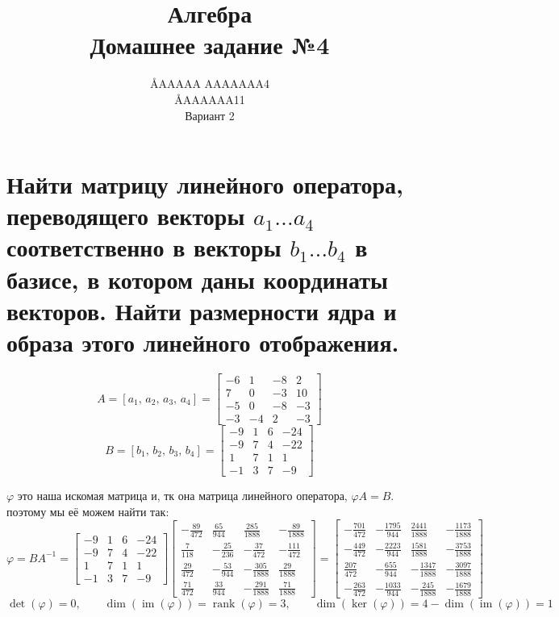 \documentclass{article}
\title{Алгебра \\ Домашнее задание №4}
\author{\AA{AAAAA AAAAAAA}{4} \\ \AA{AAAAAA}{11} \\ Вариант 2}
\renewcommand{\f}{\frac}
\renewcommand{\l}{\left}
\renewcommand{\r}{\right}
\renewcommand{\phi}{\varphi}
\DeclareMathOperator{\rank}{rank}
\DeclareMathOperator{\im}{im}
\begin{document}
  \maketitle

  \section{Найти матрицу линейного оператора, переводящего векторы $a_1 \dots a_4$ соответственно в векторы $b_1 \dots b_4$ в базисе, в котором даны координаты векторов. Найти размерности ядра и образа этого линейного отображения.}
  $$A = \l[a_1,\, a_2,\, a_3,\, a_4\r] = \begin{bmatrix}-6&1&-8&2\\7&0&-3&10\\-5&0&-8&-3\\-3&-4&2&-3\end{bmatrix}$$
  $$B = \l[b_1,\, b_2,\, b_3,\, b_4\r] = \begin{bmatrix}-9&1&6&-24\\-9&7&4&-22\\1&7&1&1\\-1&3&7&-9\end{bmatrix}$$

  \noindent
  $\phi$ это наша искомая матрица и, тк она матрица линейного оператора, $\phi A = B$.
  поэтому мы её можем найти так:
  $$\phi = BA^{-1} = \begin{bmatrix}-9&1&6&-24\\-9&7&4&-22\\1&7&1&1\\-1&3&7&-9\end{bmatrix} \begin{bmatrix}- \f{89}{472} & \f{65}{944} & \frac{285}{1888} & - \f{89}{1888}\\\f{7}{118} & - \f{25}{236} & - \f{37}{472} & - \f{111}{472}\\\f{29}{472} & - \f{53}{944} & - \f{305}{1888} & \f{29}{1888}\\\f{71}{472} & \f{33}{944} & - \f{291}{1888} & \f{71}{1888}\end{bmatrix} = \begin{bmatrix}- \f{701}{472} & - \f{1795}{944} & \f{2441}{1888} & - \f{1173}{1888}\\- \f{449}{472} & - \f{2223}{944} & \f{1581}{1888} & - \f{3753}{1888}\\\f{207}{472} & - \f{655}{944} & - \f{1347}{1888} & - \f{3097}{1888}\\- \f{263}{472} & - \f{1033}{944} & - \f{245}{1888} & - \f{1679}{1888}\end{bmatrix}$$
  $$\det(\phi) = 0, \qquad \dim(\im(\phi))=\rank(\phi) = 3, \qquad \dim(\ker(\phi))=4-\dim(\im(\phi))=1$$
\end{document}
